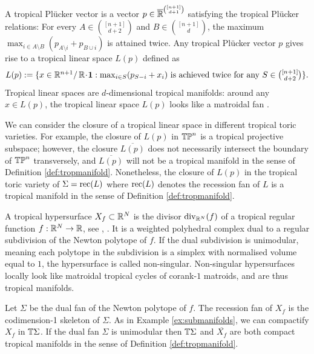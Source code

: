 \begin{exa}
A {tropical Pl\"ucker vector} is a vector $p \in \overline{\mathbb{R}}^{\binom{[n+1]}{d+1}}$
satisfying the tropical Pl\"ucker relations: 
For every $A \in \binom{[n+1]}{d+2}$ and $B \in \binom{[n+1]}{d}$, the maximum $\max_{i \in A \setminus B} (p_{A \setminus i} + p_{B \cup i})$ is attained twice. 
Any tropical Pl\"ucker vector $p$ gives rise to a {tropical linear space} $\textstyle L(p)$ defined as
\[
\textstyle L(p) := \{x \in \mathbb{R}^{n+1} / \,{\mathbb R} \!\cdot\! \mathbf 1 : \max_{i \in S} (p_{S-i} + x_i) \text{ is achieved twice for any } S \in \binom{[n+1]}{d+2}\}.
\]
Tropical linear spaces are $d$-dimensional tropical manifolds: around any $x \in \textstyle L(p)$,
the tropical linear space $\textstyle L(p)$ looks like a matroidal fan \cite{Speyer}.

We can consider the closure of a tropical linear space in different tropical toric varieties. For example, the closure of $L(p)$ in $ \mathbb{TP}^n$ is a tropical projective subspace; however, the closure $\overline{L(p)}$ does not necessarily intersect the boundary of $\mathbb{TP}^n$ transversely, and $\overline{L(p)}$ will not be a tropical manifold in the sense of Definition \ref{def:tropmanifold}.
Nonetheless, the closure of $L(p)$ in the tropical toric variety of $\Sigma = \operatorname{rec}(L)$ where $\operatorname{rec}(L)$ denotes the recession fan of $L$ is a tropical manifold in the sense of Definition \ref{def:tropmanifold}.
\end{exa}
 


\begin{exa}\label{ex:hyper}
A tropical hypersurface $X_f \subset \mathbb{R}^N$ is the divisor $\text{div}_{\mathbb{R}^N}(f)$ of a tropical regular  function  $f:\mathbb{R}^N  \to \mathbb{R}$, see \cite{MaclaganSturmfels}, \cite{MikICM}. It is a weighted  polyhedral complex dual to a regular subdivision of the Newton polytope of $f$.  If the dual subdivision is unimodular, meaning each polytope in the subdivision is a simplex with normalised volume equal to $1$, the hypersurface is called non-singular. Non-singular hypersurfaces locally look like matroidal tropical cycles of corank-$1$ matroids, and are thus tropical manifolds.

Let $\Sigma$ be the dual fan of the Newton polytope of $f$. 
The recession fan of $X_f$ is the codimension-1 skeleton of $\Sigma$. As in Example \ref{ex:submanifolds}, we can compactify $X_f$ in $\mathbb{T} \Sigma$. If the  dual fan $\Sigma$ is unimodular then $\mathbb{T} \Sigma$ and $\overline{X_f}$ are both compact tropical manifolds in the sense of Definition \ref{def:tropmanifold}.
\end{exa}



